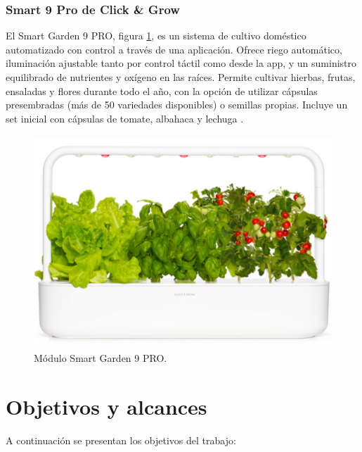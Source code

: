 
\subsubsection{Smart 9 Pro de Click \& Grow}
El Smart Garden 9 PRO, figura \ref{fig:smart_garden}, es un sistema de cultivo doméstico automatizado con control a través de una aplicación. Ofrece riego automático, iluminación ajustable tanto por control táctil como desde la app, y un suministro equilibrado de nutrientes y oxígeno en las raíces. Permite cultivar hierbas, frutas, ensaladas y flores durante todo el año, con la opción de utilizar cápsulas presembradas (más de 50 variedades disponibles) o semillas propias. Incluye un set inicial con cápsulas de tomate, albahaca y lechuga \cite{SMART:9}.

\begin{figure}[h]
	\centering
	\includegraphics[height=8cm]{./Figures/smart_garden.png}
	\caption{Módulo Smart Garden 9 PRO.}
	\label{fig:smart_garden}
\end{figure}


\section{Objetivos y alcances}

A continuación se presentan los objetivos del trabajo:

